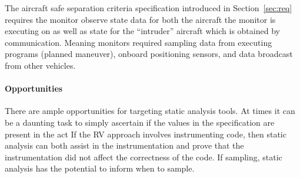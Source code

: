   The aircraft safe separation criteria specification introduced in
  Section~\ref{sec:req} requires the monitor observe state data for
  both the aircraft the monitor is executing on as well as state for
  the ``intruder'' aircraft which is obtained by
  communication. Meaning monitors required sampling data from
  executing programs (planned maneuver), onboard positioning sensors,
  and data broadcast from other vehicles.

\paragraph{Opportunities}  There are ample opportunities for targeting
static analysis tools. At times it can be a daunting task to simply
ascertain if the values in the specification are present in the act If the RV approach involves
instrumenting code, then static analysis can both assist in the
instrumentation and prove that the instrumentation did not affect the
correctness of the code. If sampling, static analysis has the
potential to inform when
to sample. 
  

